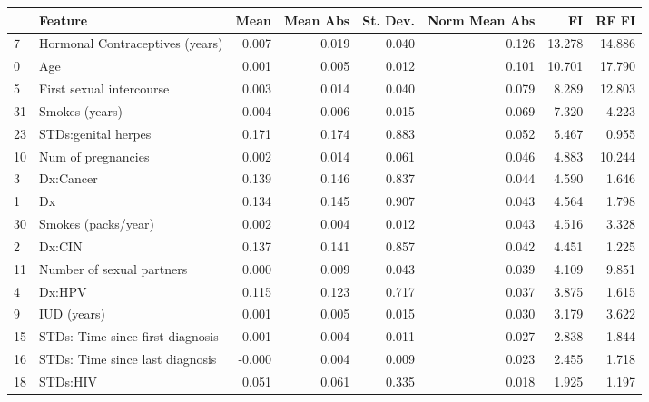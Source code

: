 \documentclass{article}
\begin{document}
\begin{tabular}{llrrrrrr}
\toprule
{} &                             Feature &   Mean &  Mean Abs &  St. Dev. &  Norm Mean Abs &      FI &   RF FI \\
\midrule
7  &     Hormonal Contraceptives (years) &  0.007 &     0.019 &     0.040 &          0.126 &  13.278 &  14.886 \\
0  &                                 Age &  0.001 &     0.005 &     0.012 &          0.101 &  10.701 &  17.790 \\
5  &            First sexual intercourse &  0.003 &     0.014 &     0.040 &          0.079 &   8.289 &  12.803 \\
31 &                      Smokes (years) &  0.004 &     0.006 &     0.015 &          0.069 &   7.320 &   4.223 \\
23 &                 STDs:genital herpes &  0.171 &     0.174 &     0.883 &          0.052 &   5.467 &   0.955 \\
10 &                  Num of pregnancies &  0.002 &     0.014 &     0.061 &          0.046 &   4.883 &  10.244 \\
3  &                           Dx:Cancer &  0.139 &     0.146 &     0.837 &          0.044 &   4.590 &   1.646 \\
1  &                                  Dx &  0.134 &     0.145 &     0.907 &          0.043 &   4.564 &   1.798 \\
30 &                 Smokes (packs/year) &  0.002 &     0.004 &     0.012 &          0.043 &   4.516 &   3.328 \\
2  &                              Dx:CIN &  0.137 &     0.141 &     0.857 &          0.042 &   4.451 &   1.225 \\
11 &           Number of sexual partners &  0.000 &     0.009 &     0.043 &          0.039 &   4.109 &   9.851 \\
4  &                              Dx:HPV &  0.115 &     0.123 &     0.717 &          0.037 &   3.875 &   1.615 \\
9  &                         IUD (years) &  0.001 &     0.005 &     0.015 &          0.030 &   3.179 &   3.622 \\
15 &    STDs: Time since first diagnosis & -0.001 &     0.004 &     0.011 &          0.027 &   2.838 &   1.844 \\
16 &     STDs: Time since last diagnosis & -0.000 &     0.004 &     0.009 &          0.023 &   2.455 &   1.718 \\
18 &                            STDs:HIV &  0.051 &     0.061 &     0.335 &          0.018 &   1.925 &   1.197 \\

\end{tabular}
\end{document}
